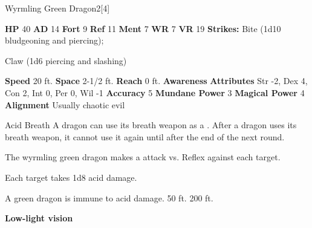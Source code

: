       
  \begin{monsubsection}{Wyrmling Green Dragon}{2}[4]
    \vspace{-1em}\vspace{-1em}
    \vspace{0em}

    
    

    \begin{spellcontent}
      \begin{spelltargetinginfo}
        \pari \textbf{HP} 40 \monsep
          \textbf{AD} 14 \monsep
          \textbf{Fort} 9 \monsep
          \textbf{Ref} 11 \monsep
          \textbf{Ment} 7
        \pari \textbf{WR} 7 \monsep
        \textbf{VR} 19
        \pari \textbf{Strikes:}
            Bite  (1d10 bludgeoning and piercing);
\par Claw  (1d6 piercing and slashing)
      \end{spelltargetinginfo}
    \end{spellcontent}
    \begin{monsterfooter}
      \pari \textbf{Speed} 20 ft. \monsep
        \textbf{Space} 2-1/2 ft. \monsep
        \textbf{Reach} 0 ft.
      \pari \textbf{Awareness} 
      \pari \textbf{Attributes}
        Str -2, Dex 4,
        Con 2, Int 0,
        Per 0, Wil -1
      \pari \textbf{Accuracy} 5 \monsep
        \textbf{Mundane Power} 3 \monsep
      \textbf{Magical Power} 4
      \pari \textbf{Alignment} Usually chaotic evil
    \end{monsterfooter}
  \end{monsubsection}
  \begin{freeability}{Acid Breath}
      A dragon can use its breath weapon as a .
      After a dragon uses its breath weapon, it cannot use it again until after the end of the next round.
      \par The wyrmling green dragon makes a  attack
        vs. Reflex against each target.
    
    \hit Each target takes 1d8 acid damage.
    \end{freeability}
  
      
       A green dragon is immune to acid damage.
     50 ft.
     200 ft.
    \par\noindent\textbf{Low-light vision}
  

